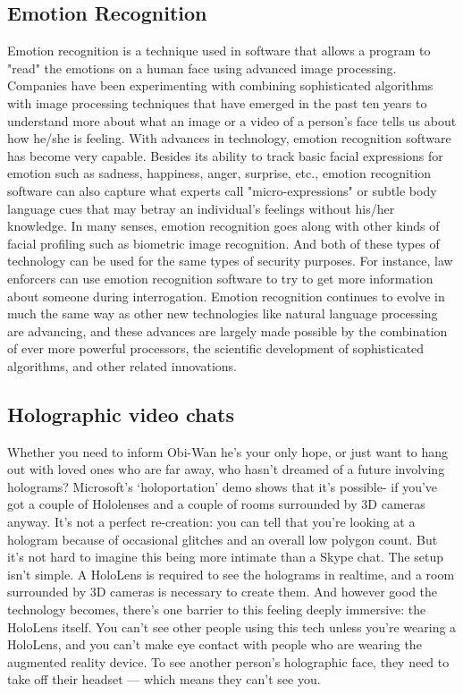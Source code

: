 \documentclass[12pt,a4paper]{article}
\begin{document}
\subsection{Emotion Recognition}
\par
Emotion recognition is a technique used in software that allows a program to "read" the emotions on a human face using advanced image processing. Companies have been experimenting with combining sophisticated algorithms with image processing techniques that have emerged in the past ten years to understand more about what an image or a video of a person's face tells us about how he/she is feeling.
With advances in technology, emotion recognition software has become very capable. Besides its ability to track basic facial expressions for emotion such as sadness, happiness, anger, surprise, etc., emotion recognition software can also capture what experts call "micro-expressions" or subtle body language cues that may betray an individual’s feelings without his/her knowledge.
In many senses, emotion recognition goes along with other kinds of facial profiling such as biometric image recognition. And both of these types of technology can be used for the same types of security purposes. For instance, law enforcers can use emotion recognition software to try to get more information about someone during interrogation. Emotion recognition continues to evolve in much the same way as other new technologies like natural language processing are advancing, and these advances are largely made possible by the combination of ever more powerful processors, the scientific development of sophisticated algorithms, and other related innovations.

\subsection{Holographic video chats}\par
Whether you need to inform Obi-Wan he’s your only hope, or just want to hang out with loved ones who are far away, who hasn’t dreamed of a future involving holograms? Microsoft’s ‘holoportation’ demo shows that it’s possible- if you’ve got a couple of Hololenses and a couple of rooms surrounded by 3D cameras anyway. 
It’s not a perfect re-creation: you can tell that you’re looking at a hologram because of occasional glitches and an overall low polygon count. But it’s not hard to imagine this being more intimate than a Skype chat.
The setup isn’t simple. A HoloLens is required to see the holograms in realtime, and a room surrounded by 3D cameras is necessary to create them. And however good the technology becomes, there’s one barrier to this feeling deeply immersive: the HoloLens itself.
You can’t see other people using this tech unless you’re wearing a HoloLens, and you can’t  make eye contact with people who are wearing the augmented reality device.  To see another person’s holographic face, they need to take off their headset — which means they can’t see you.
 
\end{document}
